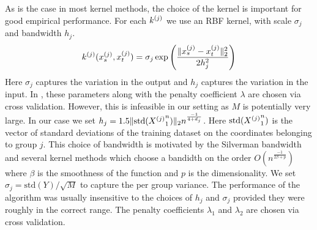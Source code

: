 As is the case in most kernel methods, the choice
of the kernel is important for good empirical performance.
For each $k^{(j)}$ we use an RBF kernel, with scale $\sigma_j$
and bandwidth $h_j$.
\[
k^{(j)}(x^{(j)}_s, x^{(j)}_t) = \sigma_j \exp \left( \frac{\|x^{(j)}_s -x^{(j)}_t\|_2^2 } 
  {2h_j^2} \right)
\]
Here $\sigma_j$ captures the variation in the output and $h_j$ captures the
variation in the input.
In \krr, these parameters along with the penalty coefficient $\lambda$ are
chosen via cross validation.
However, this is infeasible in our setting as $M$ is potentially very large. 
In our case we set $h_j = 1.5 \| \textrm{std}({X^{(j)}}_1^n) \|_2 n^{\frac{-1}{4+d_j}}$.
Here $\textrm{std}({X^{(j)}}_1^n)$ is the vector of standard deviations of the training
dataset on the coordinates belonging to group $j$. This choice of bandwidth is
motivated by the Silverman bandwidth and several kernel methods which choose 
a bandidth on the order $O(n^{\frac{-1}{2\beta+p}})$  where $\beta$ is the
smoothness of the function \cite{tsybakov08nonparametric} and $p$ is the
dimensionality. 
We set $\sigma_j = \textrm{std}(Y) / \sqrt{M}$ to capture the per group variance.
The performance of the algorithm was usually insensitive to the choices of $h_j$
and $\sigma_j$ provided they were roughly in the correct range.
The penalty coefficients $\lambda_1$ and $\lambda_2$ are chosen via cross
validation.


